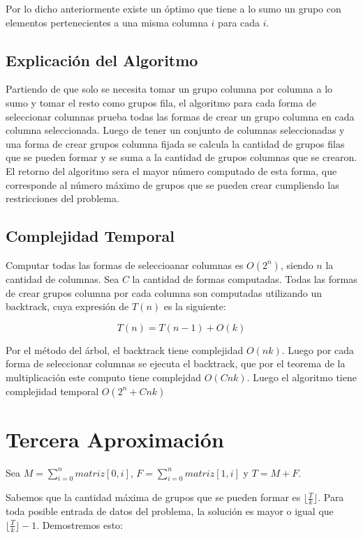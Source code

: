 \documentclass[article]{llncs}
\begin{document}
Por lo dicho anteriormente existe un \'optimo que tiene a lo sumo un grupo con elementos pertenecientes a una misma columna $i$
para cada $i$.

\subsection{Explicaci\'on del Algoritmo}

Partiendo de que solo se necesita tomar un grupo columna por columna a lo sumo y 
tomar el resto como grupos fila, el algoritmo para cada forma de seleccionar 
columnas prueba todas las formas de crear un grupo columna en cada columna seleccionada. 
Luego de tener un conjunto de columnas seleccionadas y una forma de crear grupos columna fijada se 
calcula la cantidad de grupos filas que se pueden formar y se suma a la cantidad de grupos columnas 
que se crearon. El retorno del algoritmo sera el mayor n\'umero computado de esta forma, que corresponde
al n\'umero máximo de grupos que se pueden crear cumpliendo las restricciones del problema.

\subsection{Complejidad Temporal}
Computar todas las formas de seleccioanar columnas es $O(2^n)$, siendo $n$ la cantidad de columnas. 
Sea $C$ la cantidad de formas computadas. Todas las formas de crear grupos columna por cada columna son 
computadas utilizando un backtrack, cuya expresi\'on de $T(n)$ es la siguiente:

$$T(n) = T(n-1) + O(k)$$

Por el m\'etodo del \'arbol, el backtrack tiene complejidad $O(nk)$. Luego por cada forma de seleccionar columnas se 
ejecuta el backtrack, que por el teorema de la multiplicación este computo tiene complejdad $O(Cnk)$. Luego el algoritmo 
tiene complejidad temporal $O(2^n + Cnk)$ 


\section{Tercera Aproximaci\'on}

Sea $M = \sum_{i=0}^{n}matriz[0, i]$, $F = \sum_{i=0}^{n}matriz[1, i]$ y 
$T = M + F$.

Sabemos que la cantidad máxima de grupos que se pueden formar es $\lfloor \frac{T}{k} \rfloor$.
Para toda posible entrada de datos del problema, la solución es mayor o igual que 
$\lfloor \frac{T}{k} \rfloor - 1$. Demostremos esto: 
\end{document}
